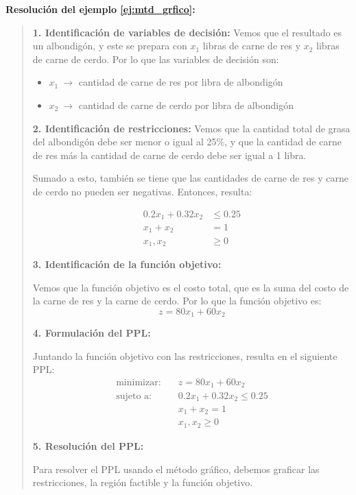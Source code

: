 \noindent\textbf{Resolución del ejemplo \ref{ej:mtd_grfico}:}
\begin{quote}
  \textbf{1. Identificación de variables de decisión:}
  Vemos que el resultado es un albondigón, y este se prepara con \(x_1\) libras de carne de res y \(x_2\) libras de carne de cerdo. Por lo que las variables de decisión son:
  \begin{itemize}
    \item \(x_1 ~\rightarrow\) cantidad de carne de res por libra de albondigón
    \item \(x_2 ~\rightarrow\) cantidad de carne de cerdo por libra de albondigón
  \end{itemize}

  \textbf{2. Identificación de restricciones:}
  Vemos que la cantidad total de grasa del albondigón debe ser menor o igual al 25\%, y que la cantidad de carne de res más la cantidad de carne de cerdo debe ser igual a 1 libra.

  Sumado a esto, también se tiene que las cantidades de carne de res y carne de cerdo no pueden ser negativas. Entonces, resulta:

  \begin{align*}
    0.2x_1 + 0.32x_2 &\leq 0.25 \\
    x_1 + x_2 &= 1 \\
    x_1, x_2 &\geq 0
  \end{align*}

  \textbf{3. Identificación de la función objetivo:}

  Vemos que la función objetivo es el costo total, que es la suma del costo de la carne de res y la carne de cerdo. Por lo que la función objetivo es:
  \[
    z = 80x_1 + 60x_2
  \]

  \textbf{4. Formulación del PPL:}

  Juntando la función objetivo con las restricciones, resulta en el siguiente PPL:
  \begin{align*}
    \text{minimizar:} \quad   &z = 80x_1 + 60x_2 \\[3pt]
    \text{sujeto a:} \quad    &0.2x_1 + 0.32x_2 \leq 0.25 \\
                              &x_1 + x_2 = 1 \\
                              &x_1, x_2 \geq 0
  \end{align*}

  \textbf{5. Resolución del PPL:}

  Para resolver el PPL usando el método gráfico, debemos graficar las restricciones, la región factible y la función objetivo. 


\end{quote}
